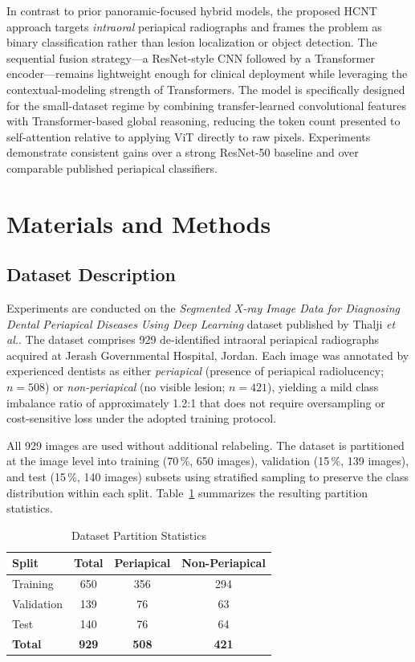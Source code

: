 \documentclass[conference]{IEEEtran}
\newcommand{\HCNT}{\textsc{HCNT}\xspace}
\newcommand{\etal}{\textit{et al.}\xspace}
\begin{document}
In contrast to prior panoramic-focused hybrid models, the proposed \HCNT
approach targets \emph{intraoral} periapical radiographs and frames the problem
as binary classification rather than lesion localization or object detection.
The sequential fusion strategy---a ResNet-style CNN followed by a Transformer
encoder---remains lightweight enough for clinical deployment while leveraging
the contextual-modeling strength of Transformers. The model is specifically
designed for the small-dataset regime by combining transfer-learned
convolutional features with Transformer-based global reasoning, reducing the
token count presented to self-attention relative to applying ViT directly to
raw pixels. Experiments demonstrate consistent gains over a strong ResNet-50
baseline and over comparable published periapical classifiers.

\section{Materials and Methods}
\label{sec:methods}

\subsection{Dataset Description}

Experiments are conducted on the \emph{Segmented X-ray Image Data for
Diagnosing Dental Periapical Diseases Using Deep Learning} dataset published
by Thalji \etal \cite{thalji2024}. The dataset comprises 929 de-identified
intraoral periapical radiographs acquired at Jerash Governmental Hospital,
Jordan. Each image was annotated by experienced dentists as either
\emph{periapical} (presence of periapical radiolucency; $n=508$) or
\emph{non-periapical} (no visible lesion; $n=421$), yielding a mild
class imbalance ratio of approximately 1.2:1 that does not require oversampling
or cost-sensitive loss under the adopted training protocol.

All 929 images are used without additional relabeling. The dataset is
partitioned at the image level into training (70\,\%, 650 images), validation
(15\,\%, 139 images), and test (15\,\%, 140 images) subsets using stratified
sampling to preserve the class distribution within each split.
Table~\ref{tab:dataset} summarizes the resulting partition statistics.

\begin{table}[t]
  \centering
  \caption{Dataset Partition Statistics}
  \label{tab:dataset}
  \renewcommand{\arraystretch}{1.2}
  \begin{tabular}{lccc}
    \toprule
    \textbf{Split} & \textbf{Total} & \textbf{Periapical} &
    \textbf{Non-Periapical} \\
    \midrule
    Training   & 650 & 356 & 294 \\
    Validation & 139 &  76 &  63 \\
    Test       & 140 &  76 &  64 \\
    \midrule
    \textbf{Total} & \textbf{929} & \textbf{508} & \textbf{421} \\
    \bottomrule
  \end{tabular}
\end{table}
\end{document}

